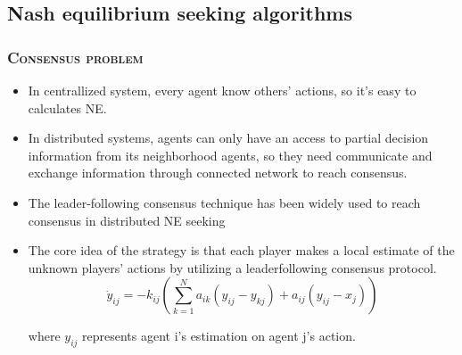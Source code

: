 \subsection[Nash equilibrium seeking algorithms]{Nash equilibrium seeking algorithms}\label{subsec:2-3}
\begin{frame}
  \frametitle{\normalsize\textsc{Consensus problem}}\transwipe
  
  \begin{itemize}
    \item In centrallized system, every agent know others' actions, so it's easy to calculates NE.
    \item In distributed systems, agents can only have an access to \textcolor[rgb]{0.00,0.00,1.00}{partial decision information}
    from its neighborhood agents, so they need communicate and exchange information through connected network to reach consensus.
    \item The \textcolor[rgb]{0.00,0.00,1.00}{leader-following} consensus technique has been widely used to reach consensus in distributed NE seeking
    \item The core idea of the strategy is that each player makes a local estimate of the unknown players’ actions by utilizing a leaderfollowing consensus protocol. 
    \begin{equation}
    \dot{y}_{i j}=-k_{i j}\left(\sum_{k=1}^{N} a_{i k}\left(y_{i j}-y_{k j}\right)+a_{i j}\left(y_{i j}-x_{j}\right)\right)
     \end{equation}

    where $y_{ij}$ represents agent i's estimation on agent j's action.
    \end{itemize}
  \end{frame}
  

